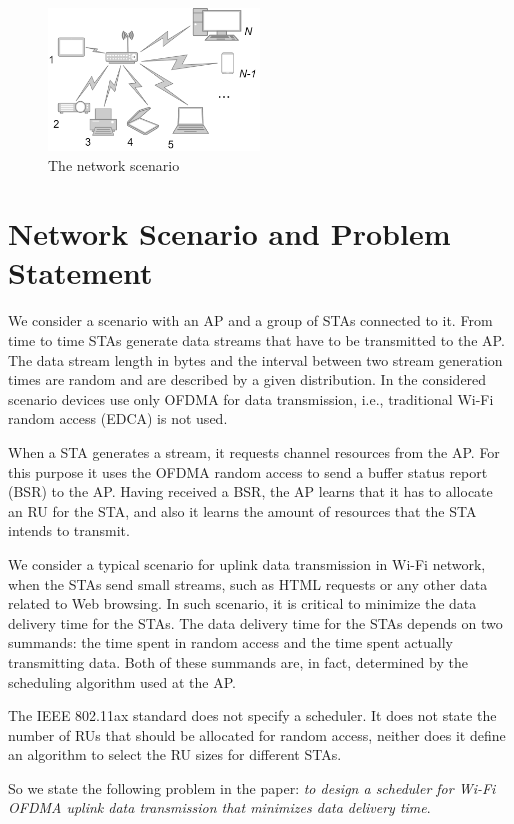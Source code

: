 \begin{figure}[tb]
	\includegraphics[width = 0.5\textwidth]{NetworkScenario}
	\caption{\label{fig:scenario} The network scenario}
\end{figure}

\section{Network Scenario and Problem Statement}
We consider a scenario with an AP and a group of STAs connected to it.
From time to time STAs generate data streams that have to be transmitted to the AP.
The data stream length in bytes and the interval between two stream generation times are random and are described by a given distribution.
In the considered scenario devices use only OFDMA for data transmission, i.e., traditional Wi-Fi random access (EDCA) is not used.

When a STA generates a stream, it requests channel resources from the AP.
For this purpose it uses the OFDMA random access to send a buffer status report (BSR) to the AP.
Having received a BSR, the AP learns that it has to allocate an RU for the STA, and also it learns the amount of resources that the STA intends to transmit.

We consider a typical scenario for uplink data transmission in Wi-Fi network, when the STAs send small streams, such as HTML requests or any other data related to Web browsing.
In such scenario, it is critical to minimize the data delivery time for the STAs.
The data delivery time for the STAs depends on two summands: the time spent in random access and the time spent actually transmitting data.
Both of these summands are, in fact, determined by the scheduling algorithm used at the AP.

The IEEE 802.11ax standard does not specify a scheduler.
It does not state the number of RUs that should be allocated for random access, neither does it define an algorithm to select the RU sizes for different STAs.

So we state the following problem in the paper: \emph{to design a scheduler for Wi-Fi OFDMA uplink data transmission that minimizes data delivery time}.

